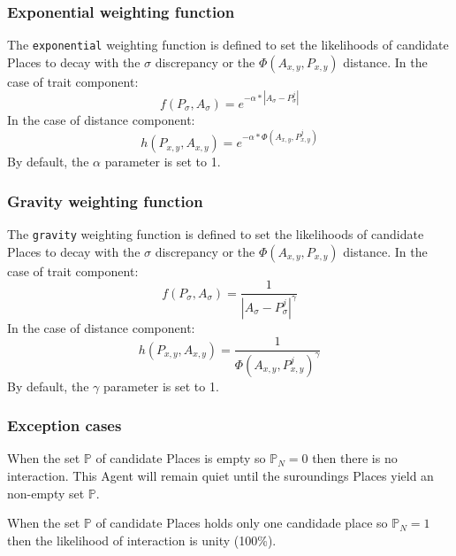 \documentclass{article}
\begin{document}
\subsubsection{Exponential weighting function}

\par The \texttt{exponential} weighting function is defined to set the likelihoods of candidate Places to decay with the $\sigma$ discrepancy or the $\Phi(A_{x,y},P_{x,y})$ distance. In the case of trait component:
\begin{equation}
     f(P_{\sigma}, A_{\sigma}) = e^{- \alpha * |A_{\sigma} - P^{j}_{\sigma}|}
\end{equation}
In the case of distance component:
\begin{equation}
      h(P_{x,y}, A_{x,y}) = e^{- \alpha * \Phi(A_{x,y},P^{j}_{x,y})}
\end{equation}
By default, the $\alpha$ parameter is set to 1.

\subsubsection{Gravity weighting function}

\par The \texttt{gravity} weighting function is defined to set the likelihoods of candidate Places to decay with the $\sigma$ discrepancy or the $\Phi(A_{x,y},P_{x,y})$ distance. In the case of trait component:
\begin{equation}
     f(P_{\sigma}, A_{\sigma}) = \frac{1}{|A_{\sigma} - P^{j}_{\sigma}|^{\gamma}}
\end{equation}
In the case of distance component:
\begin{equation}
      h(P_{x,y}, A_{x,y}) = \frac{1}{\Phi(A_{x,y},P^{j}_{x,y})^{\gamma}}
\end{equation}
By default, the $\gamma$ parameter is set to 1.


\subsubsection{Exception cases}

\par When the set $\mathbb{P}$ of candidate Places is empty so ${\mathbb{P}}_N = 0$ then there is no interaction. This Agent will remain quiet until the suroundings Places yield an non-empty set $\mathbb{P}$.

\par When the set $\mathbb{P}$ of candidate Places holds only one candidade place so ${\mathbb{P}}_N = 1$ then the likelihood of interaction is unity (100\%).
\end{document}
